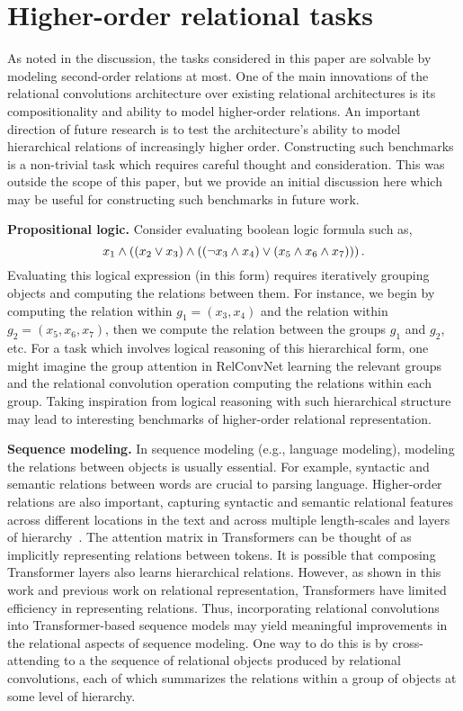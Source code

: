 \section{Higher-order relational tasks}

As noted in the discussion, the tasks considered in this paper are solvable by modeling second-order relations at most. One of the main innovations of the relational convolutions architecture over existing relational architectures is its compositionality and ability to model higher-order relations. An important direction of future research is to test the architecture's ability to model hierarchical relations of increasingly higher order. Constructing such benchmarks is a non-trivial task which requires careful thought and consideration. This was outside the scope of this paper, but we provide an initial discussion here which may be useful for constructing such benchmarks in future work.

\textbf{Propositional logic.} Consider evaluating boolean logic formula such as, 
\begin{equation*}
    x_1 \land \left((x_2 \lor x_3) \land \left((\lnot x_3 \land x_4) \lor (x_5 \land x_6 \land x_7)\right)\right).
\end{equation*}
Evaluating this logical expression (in this form) requires iteratively grouping objects and computing the relations between them. For instance, we begin by computing the relation within $g_1 = (x_3, x_4)$ and the relation within $g_2 = (x_5, x_6, x_7)$, then we compute the relation between the groups $g_1$ and $g_2$, etc. For a task which involves logical reasoning of this hierarchical form, one might imagine the group attention in RelConvNet learning the relevant groups and the relational convolution operation computing the relations within each group. Taking inspiration from logical reasoning with such hierarchical structure may lead to interesting benchmarks of higher-order relational representation.

\textbf{Sequence modeling.} In sequence modeling (e.g., language modeling), modeling the relations between objects is usually essential. For example, syntactic and semantic relations between words are crucial to parsing language. Higher-order relations are also important, capturing syntactic and semantic relational features across different locations in the text and across multiple length-scales and layers of hierarchy~\citep[see for example some relevant work in linguistics][]{frank2012hierarchical,rosario2002descent}. The attention matrix in Transformers can be thought of as implicitly representing relations between tokens. It is possible that composing Transformer layers also learns hierarchical relations. However, as shown in this work and previous work on relational representation, Transformers have limited efficiency in representing relations. Thus, incorporating relational convolutions into Transformer-based sequence models may yield meaningful improvements in the relational aspects of sequence modeling. One way to do this is by cross-attending to a the sequence of relational objects produced by relational convolutions, each of which summarizes the relations within a group of objects at some level of hierarchy.

